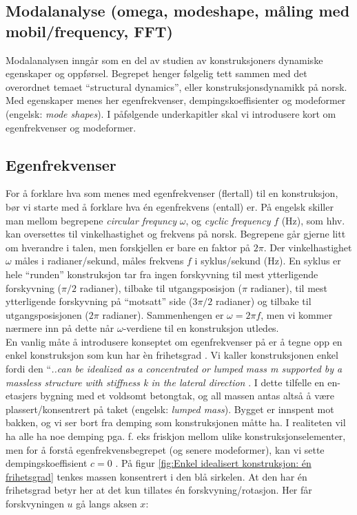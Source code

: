 \subsection{Modalanalyse (omega, modeshape, måling med mobil/frequency, FFT)} 

Modalanalysen inngår som en del av studien av konstruksjoners dynamiske egenskaper og oppførsel. Begrepet henger følgelig tett sammen med det overordnet temaet ``structural dynamics'', eller konstruksjonsdynamikk på norsk. Med egenskaper menes her egenfrekvenser, dempingskoeffisienter og modeformer (engelsk: \emph{mode shapes}). I påfølgende underkapitler skal vi introdusere kort om egenfrekvenser og modeformer.

\subsection{Egenfrekvenser}
For å forklare hva som menes med egenfrekvenser (flertall) til en konstruksjon, bør vi starte med å forklare hva én egenfrekvens (entall) er. På engelsk skiller man mellom begrepene \emph{circular frequncy} $\omega$, og \emph{cyclic frequency} $f$ (Hz), som hhv. kan oversettes til vinkelhastighet og frekvens på norsk. Begrepene går gjerne litt om hverandre i talen, men forskjellen er bare en faktor på $2\pi$. Der vinkelhastighet $\omega$ måles i radianer/sekund, måles frekvens $f$ i syklus/sekund (Hz). En syklus er hele ``runden'' konstruksjon tar fra ingen forskyvning til mest ytterligende forskyvning ($\pi/2$ radianer), tilbake til utgangsposisjon ($\pi$ radianer), til mest ytterligende forskyvning på ``motsatt'' side ($3\pi/2$ radianer) og tilbake til utgangsposisjonen ($2\pi$ radianer).  Sammenhengen er $\omega = 2 \pi f$, men vi kommer nærmere inn på dette når $\omega$-verdiene til en konstruksjon utledes. \\

En vanlig måte å introdusere konseptet om egenfrekvenser på er å tegne opp en enkel konstruksjon som kun har èn frihetsgrad \parencite{CE809_FreeVibrationResponseOfSDFSystems}. Vi kaller konstruksjonen enkel fordi den ``\emph{..can be idealized as a concentrated or lumped mass \emph{m} supported by a massless structure with stiffness \emph{k} in the lateral direction} \parencite[s. 3]{Chopra2019-da}. I dette tilfelle en en-etasjers bygning med et voldsomt betongtak, og all massen antas altså å være plassert/konsentrert på taket (engelsk: \emph{lumped mass}). Bygget er innspent mot bakken, og vi ser bort fra demping som konstruksjonen måtte ha. I realiteten vil ha alle ha noe demping pga. f. eks friskjon mellom ulike konstruksjonselementer, men for å forstå egenfrekvensbegrepet (og senere modeformer), kan vi sette dempingskoeffisient $c=0$ \parencite[]{CE809_FreeVibrationResponseOfSDFSystems}. På figur \ref{fig:Enkel idealisert konstruksjon: én frihetsgrad} tenkes massen konsentrert i den blå sirkelen. At den har én frihetsgrad betyr her at det kun tillates én forskvyning/rotasjon. Her får forskvyningen $u$ gå langs aksen $x$:

